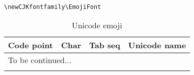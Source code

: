 \documentclass[oneside]{ctexbook} %
\begin{document}


\verb!\newCJKfontfamily\EmojiFont! \\ %


\begin{longtable}{ccll}
    \caption{Unicode emoji} \\
    \toprule
    Code point & Char & Tab seq & Unicode name \\
    \hline \endhead
    \multicolumn{4}{l}{To be continued...} \\ 
    \midrule \endfoot
    \bottomrule \endlastfoot
    
    
\end{longtable}
\end{document}
